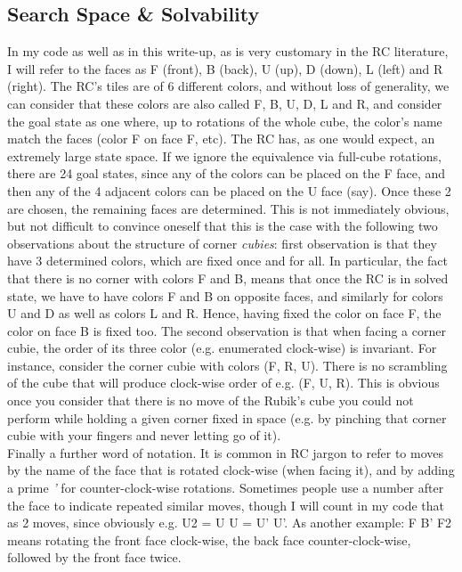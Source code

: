 \subsection{Search Space \& Solvability}
In my code as well as in this write-up, as is very customary in the RC literature, I will refer to the faces as F (front), B (back), U (up), D (down), L (left) and R (right). The RC's tiles are of 6 different colors, and without loss of generality, we can consider that these colors are also called F, B, U, D, L and R, and consider the goal state as one where, up to rotations of the whole cube, the color's name match the faces (color F on face F, etc). The RC has, as one would expect, an extremely large state space. If we ignore the equivalence via full-cube rotations, there are 24 goal states, since any of the colors can be placed on the F face, and then any of the 4 adjacent colors can be placed on the U face (say). Once these 2 are chosen, the remaining faces are determined. This is not immediately obvious, but not difficult to convince oneself that this is the case with the following two observations about the structure of corner \textit{cubies}: first observation is that they have 3 determined colors, which are fixed once and for all. In particular, the fact that there is no corner with colors F and B, means that once the RC is in solved state, we have to have colors F and B on opposite faces, and similarly for colors U and D as well as colors L and R. Hence, having fixed the color on face F, the color on face B is fixed too. The second observation is that when facing a corner cubie, the order of its three color (e.g. enumerated clock-wise) is invariant. For instance, consider the corner cubie with colors (F, R, U). There is no scrambling of the cube that will produce clock-wise order of e.g. (F, U, R). This is obvious once you consider that there is no move of the Rubik's cube you could not perform while holding a given corner fixed in space (e.g. by pinching that corner cubie with your fingers and never letting go of it).
\\
Finally a further word of notation. It is common in RC jargon to refer to moves  by the name of the face that is rotated clock-wise (when facing it), and by adding a prime \textit{'} for counter-clock-wise rotations. Sometimes people use a number after the face to indicate repeated similar moves, though I will count in my code that as 2 moves, since obviously e.g. U2 = U U = U' U'. As another example: F B' F2 means rotating the front face clock-wise, the back face counter-clock-wise, followed by the front face twice.

